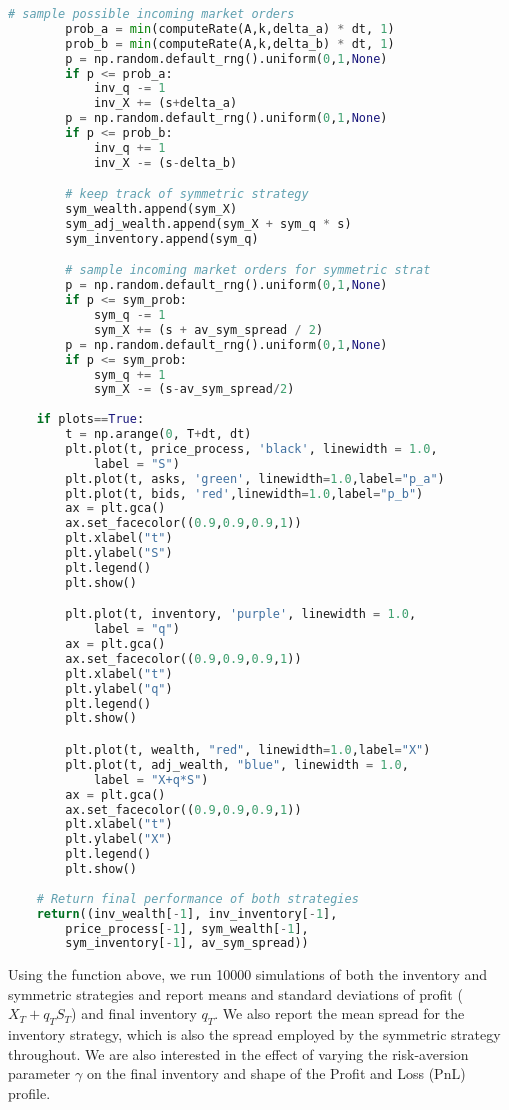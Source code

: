 \begin{lstlisting}[language=Python, caption=Avellaneda-Stoikov Model]
        # sample possible incoming market orders
        prob_a = min(computeRate(A,k,delta_a) * dt, 1)
        prob_b = min(computeRate(A,k,delta_b) * dt, 1)
        p = np.random.default_rng().uniform(0,1,None)
        if p <= prob_a:
            inv_q -= 1
            inv_X += (s+delta_a)
        p = np.random.default_rng().uniform(0,1,None)
        if p <= prob_b:
            inv_q += 1
            inv_X -= (s-delta_b)

        # keep track of symmetric strategy
        sym_wealth.append(sym_X) 
        sym_adj_wealth.append(sym_X + sym_q * s)
        sym_inventory.append(sym_q)

        # sample incoming market orders for symmetric strat
        p = np.random.default_rng().uniform(0,1,None)
        if p <= sym_prob:
            sym_q -= 1
            sym_X += (s + av_sym_spread / 2)
        p = np.random.default_rng().uniform(0,1,None)
        if p <= sym_prob:
            sym_q += 1
            sym_X -= (s-av_sym_spread/2)
    
    if plots==True:
        t = np.arange(0, T+dt, dt)
        plt.plot(t, price_process, 'black', linewidth = 1.0, 
            label = "S")
        plt.plot(t, asks, 'green', linewidth=1.0,label="p_a")
        plt.plot(t, bids, 'red',linewidth=1.0,label="p_b")
        ax = plt.gca()
        ax.set_facecolor((0.9,0.9,0.9,1))
        plt.xlabel("t")
        plt.ylabel("S")
        plt.legend()
        plt.show()

        plt.plot(t, inventory, 'purple', linewidth = 1.0, 
            label = "q")
        ax = plt.gca()
        ax.set_facecolor((0.9,0.9,0.9,1))
        plt.xlabel("t")
        plt.ylabel("q")
        plt.legend()
        plt.show()

        plt.plot(t, wealth, "red", linewidth=1.0,label="X")
        plt.plot(t, adj_wealth, "blue", linewidth = 1.0, 
            label = "X+q*S")
        ax = plt.gca()
        ax.set_facecolor((0.9,0.9,0.9,1))
        plt.xlabel("t")
        plt.ylabel("X")
        plt.legend()
        plt.show()
    
    # Return final performance of both strategies
    return((inv_wealth[-1], inv_inventory[-1], 
        price_process[-1], sym_wealth[-1], 
        sym_inventory[-1], av_sym_spread))
\end{lstlisting}

Using the function above, we run 10000 simulations of both the inventory
and symmetric strategies and report means and standard deviations of 
profit ($X_T+q_TS_T$) and final inventory $q_T$. We also report the 
mean spread for the inventory strategy, which is also the spread employed
by the symmetric strategy throughout. We are also interested
in the effect of varying the risk-aversion parameter $\gamma$ on the 
final inventory and shape of the Profit and Loss (PnL) profile.

